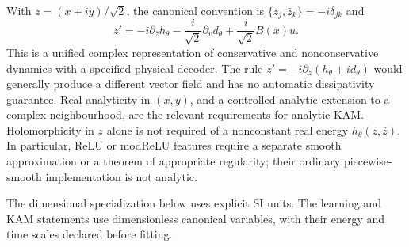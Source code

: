 With $z=(x+iy)/\sqrt2$, the canonical convention is
$\{z_j,\bar z_k\}=-i\delta_{jk}$ and
\begin{equation}
 z'=-i\partial_{\bar z}h_\theta
       -\frac{i}{\sqrt2}\partial_vd_\theta
       +\frac{i}{\sqrt2}B(x)u.
\end{equation}
This is a unified complex representation of conservative and
nonconservative dynamics with a specified physical decoder. The rule
$z'=-i\partial_{\bar z}(h_\theta+i d_\theta)$ would generally produce
a different vector field and has no automatic dissipativity guarantee.
Real analyticity in $(x,y)$, and a controlled analytic extension to a
complex neighbourhood, are the relevant requirements for analytic KAM.
Holomorphicity in $z$ alone is not required of a nonconstant real energy
$h_\theta(z,\bar z)$. In particular, ReLU or modReLU features require a
separate smooth approximation or a theorem of appropriate regularity;
their ordinary piecewise-smooth implementation is not analytic.


The dimensional specialization below uses explicit SI units. The learning
and KAM statements use dimensionless canonical variables, with their
energy and time scales declared before fitting.
